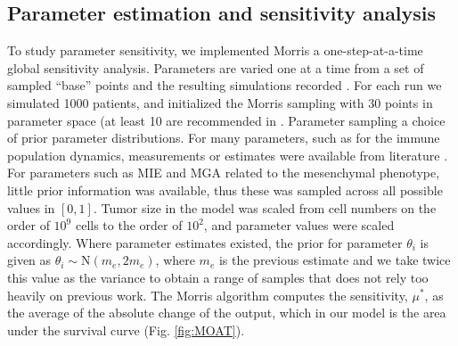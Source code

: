 \documentclass[11pt]{article}
\begin{document}
\subsection{Parameter estimation and sensitivity analysis}
To study parameter sensitivity, we implemented Morris a one-step-at-a-time global sensitivity analysis. Parameters are varied one at a time from a set of sampled ``base'' points and the resulting simulations recorded \cite{morris1991factorial, sohier2014improvement}. For each run we simulated 1000 patients, and initialized the Morris sampling with 30 points in parameter space (at least 10 are recommended in \cite{sohier2014improvement}. Parameter sampling a choice of prior parameter distributions. For many parameters, such as for the immune population dynamics,  measurements or estimates were available from literature \cite{de2014modeling}. For parameters such as MIE and MGA related to the mesenchymal phenotype, little prior information was available, thus these was sampled across all possible values in $[0,1]$. Tumor size in the model was scaled from cell numbers on the order of $10^9$ cells\cite{de2014modeling} to the order of $10^2$, and parameter values were scaled accordingly. Where parameter estimates existed, the prior for parameter $\theta_i$ is given as $\theta_i \sim \textrm{N}(m_e, 2m_e)$, where $m_e$ is the previous estimate and we take twice this value as the variance to obtain a range of samples that does not rely too heavily on previous work. The Morris algorithm computes the sensitivity, $\mu^*$, as the average of the absolute change of the output, which in our model is the area under the survival curve (Fig. \ref{fig:MOAT}).
\end{document}
